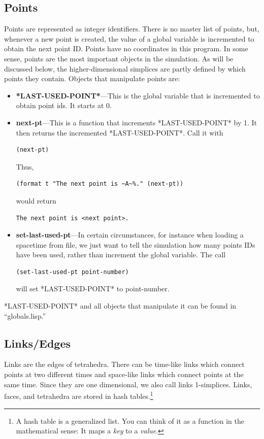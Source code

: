 \documentclass[12pt]{article}
\begin{document}
\subsection{Points}
\label{ss:points}

Points are represented as integer identifiers. There is no master list
of points, but, whenever a new point is created, the value of a global
variable is incremented to obtain the next point ID. Points have no
coordinates in this program. In some sense, points are the most
important objects in the simulation. As will be discussed below, the
higher-dimensional simplices are partly defined by which points they
contain. Objects that manipulate points are:
\begin{itemize}
\item \textbf{*LAST-USED-POINT*}---This is the global variable that is
  incremented to obtain point ids. It starts at 0.
\item \textbf{next-pt}---This is a function that increments
  *LAST-USED-POINT* by 1. It then returns the incremented
  *LAST-USED-POINT*. Call it with
\begin{lstlisting}
(next-pt)
\end{lstlisting}
Thus, 
\begin{lstlisting}
(format t "The next point is ~A~%." (next-pt))
\end{lstlisting}
would return 
\begin{verbatim}
The next point is <next point>.
\end{verbatim}
\item \textbf{set-last-used-pt}---In certain circumstances, for
  instance when loading a spacetime from file, we just want to tell
  the simulation how many points IDs have been used, rather than
  increment the global variable. The call
\begin{lstlisting}
(set-last-used-pt point-number)
\end{lstlisting}
will set *LAST-USED-POINT* to point-number.
\end{itemize}

*LAST-USED-POINT* and all objects that manipulate it can be found in ``globals.lisp.''

\subsection{Links/Edges}
\label{s:links-edges}
Links are the edges of tetrahedra. There can be time-like links which
connect points at two different times and space-like links which
connect points at the same time. Since they are one dimensional, we
also call links 1-simplices. Links, faces, and tetrahedra are stored
in hash tables.\footnote{A hash table is a generalized list. You can
  think of it as a function in the mathematical sense: It maps a
  \textit{key} to a \textit{value}.} 
\end{document}
